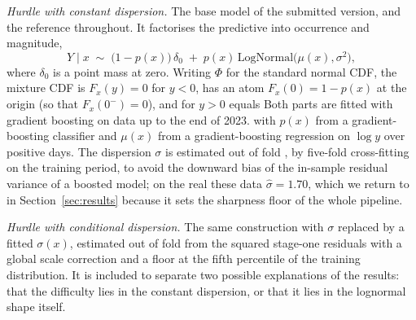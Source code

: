 \documentclass[preprint,3p,times]{elsarticle}
\providecommand{\DIFaddtex}[1]{{\protect\color{blue} \sf #1}} %
\providecommand{\DIFdeltex}[1]{{\protect\color{red} \scriptsize #1}} %
\providecommand{\DIFaddbegin}{} %
\providecommand{\DIFaddend}{} %
\providecommand{\DIFdelbegin}{} %
\providecommand{\DIFdelend}{} %
\providecommand{\DIFadd}[1]{\texorpdfstring{\DIFaddtex{#1}}{#1}} %
\providecommand{\DIFdel}[1]{\texorpdfstring{\DIFdeltex{#1}}{}} %
\begin{document}
\DIFadd{\emph{Hurdle with constant dispersion.} The base model of the submitted version, and the reference throughout. It factorises the predictive into occurrence and magnitude,
}\DIFaddend \begin{equation}
Y \mid x \;\sim\; \big(1-p(x)\big)\,\delta_0 \;+\; p(x)\,\mathrm{LogNormal}\big(\mu(x),\sigma^2\big),
\label{eq:hurdle}
\end{equation}
\DIFdelbegin \DIFdel{where $\delta_0$ is a point mass at zero. Writing $\Phi$ for the standard normal CDF, the mixture CDF is $F_x(y)=0$ for $y<0$, has an atom $F_x(0)=1-p(x)$ at the origin (so that $F_x(0^-)=0$), and for $y>0$ equals
}%
\DIFdel{Both parts are fitted with gradient boosting on data up to the end of 2023. }\DIFdelend \DIFaddbegin \DIFadd{with $p(x)$ from a gradient-boosting classifier and $\mu(x)$ from a gradient-boosting regression on $\log y$ over positive days. }\DIFaddend The dispersion $\sigma$ is estimated out of fold\DIFaddbegin \DIFadd{, by five-fold cross-fitting on the training period, }\DIFaddend to avoid the downward bias of the in-sample residual variance of a boosted model; on \DIFdelbegin \DIFdel{the real }\DIFdelend \DIFaddbegin \DIFadd{these }\DIFaddend data $\hat\sigma=1.70$, which we return to in Section~\ref{sec:results} because it sets the sharpness floor of the whole pipeline.

\DIFaddbegin \DIFadd{\emph{Hurdle with conditional dispersion.} The same construction with $\sigma$ replaced by a fitted $\sigma(x)$, estimated out of fold from the squared stage-one residuals with a global scale correction and a floor at the fifth percentile of the training distribution. It is included to separate two possible explanations of the results: that the difficulty lies in the constant dispersion, or that it lies in the lognormal shape itself.
}
\end{document}
